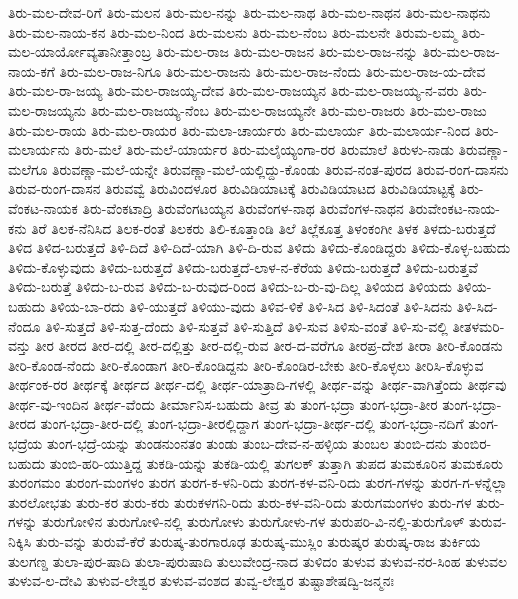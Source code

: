 {ತಿರು-ಮಲ-ದೇವ-ರಿಗೆ
ತಿರು-ಮಲನ
ತಿರು-ಮಲ-ನನ್ನು
ತಿರು-ಮಲ-ನಾಥ
ತಿರು-ಮಲ-ನಾಥನ
ತಿರು-ಮಲ-ನಾಥನು
ತಿರು-ಮಲ-ನಾಯ-ಕನ
ತಿರು-ಮಲ-ನಿಂದ
ತಿರು-ಮಲನು
ತಿರು-ಮಲ-ನೆಂಬ
ತಿರು-ಮಲನೇ
ತಿರುಮ-ಲಮ್ಮ
ತಿರು-ಮಲ-ಯಾರ್ಯೋವ್ಯತಾನೀತ್ತಾಂಬ್ರ
ತಿರು-ಮಲ-ರಾಜ
ತಿರು-ಮಲ-ರಾಜನ
ತಿರು-ಮಲ-ರಾಜ-ನನ್ನು
ತಿರು-ಮಲ-ರಾಜ-ನಾಯ-ಕಗೆ
ತಿರು-ಮಲ-ರಾಜ-ನಿಗೂ
ತಿರು-ಮಲ-ರಾಜನು
ತಿರು-ಮಲ-ರಾಜ-ನೆಂದು
ತಿರು-ಮಲ-ರಾಜ-ಯ-ದೇವ
ತಿರು-ಮಲ-ರಾ-ಜಯ್ಯ
ತಿರು-ಮಲ-ರಾಜಯ್ಯ-ದೇವ
ತಿರು-ಮಲ-ರಾಜಯ್ಯನ
ತಿರು-ಮಲ-ರಾಜಯ್ಯ-ನ-ವರು
ತಿರು-ಮಲ-ರಾಜಯ್ಯನು
ತಿರು-ಮಲ-ರಾಜಯ್ಯ-ನೆಂಬ
ತಿರು-ಮಲ-ರಾಜಯ್ಯನೇ
ತಿರು-ಮಲ-ರಾಜರು
ತಿರು-ಮಲ-ರಾಜು
ತಿರು-ಮಲ-ರಾಯ
ತಿರು-ಮಲ-ರಾಯರ
ತಿರು-ಮಲಾ-ಚಾರ್ಯರು
ತಿರು-ಮಲಾರ್ಯ
ತಿರು-ಮಲಾರ್ಯ-ನಿಂದ
ತಿರು-ಮಲಾರ್ಯನು
ತಿರು-ಮಲೆ
ತಿರು-ಮಲೆ-ಯಾರ್ಯರ
ತಿರು-ಮಲೈಯ್ಯಂಗಾ-ರರ
ತಿರುಮಾಲೆ
ತಿರುಳು-ನಾಡು
ತಿರುವಣ್ಣಾ-ಮಲೆಗೂ
ತಿರುವಣ್ಣಾ-ಮಲೆ-ಯನ್ನೇ
ತಿರುವಣ್ಣಾ-ಮಲೆ-ಯಲ್ಲಿದ್ದು-ಕೊಂಡು
ತಿರುವ-ನಂತ-ಪುರದ
ತಿರುವ-ರಂಗ-ದಾಸನು
ತಿರುವ-ರುಂಗ-ದಾಸನ
ತಿರುವವ್ವೆ
ತಿರುವಿಂದಳೂರ
ತಿರುವಿಡಿಯಾಟಕ್ಕೆ
ತಿರುವಿಡಿಯಾಟದ
ತಿರುವಿಡಿಯಾಟ್ಟಕ್ಕೆ
ತಿರು-ವೆಂಕಟ-ನಾಯಕ
ತಿರು-ವೆಂಕಟಾದ್ರಿ
ತಿರುವೆಂಗಟಯ್ಯನ
ತಿರುವೆಂಗಳ-ನಾಥ
ತಿರುವೆಂಗಳ-ನಾಥನ
ತಿರುವೇಂಕಟ-ನಾಯ-ಕನು
ತಿರೆ
ತಿಲಕ-ನೆನಿಸಿದ
ತಿಲಕ-ರಂತೆ
ತಿಲಕರು
ತಿಲಿ-ಕೂತ್ತಾಂಡಿ
ತಿಲೆ
ತಿಲ್ಲೆಕೂತ್ತ
ತಿಳಂಕಂಗೀ
ತಿಳಕ
ತಿಳದು-ಬರುತ್ತದೆ
ತಿಳಿದ
ತಿಳಿದ-ಬರುತ್ತದೆ
ತಿಳಿ-ದಿದೆ
ತಿಳಿ-ದಿದೆ-ಯಾಗಿ
ತಿಳಿ-ದಿ-ರುವ
ತಿಳಿದು
ತಿಳಿದು-ಕೊಂಡಿದ್ದರು
ತಿಳಿದು-ಕೊಳ್ಳ-ಬಹುದು
ತಿಳಿದು-ಕೊಳ್ಳುವುದು
ತಿಳಿದು-ಬರುತ್ತದೆ
ತಿಳಿದು-ಬರುತ್ತದೆ-ಲಾಳ-ನ-ಕೆರೆಯ
ತಿಳಿದು-ಬರುತ್ತದೆೆ
ತಿಳಿದು-ಬರುತ್ತವೆ
ತಿಳಿದು-ಬರುತ್ತೆ
ತಿಳಿದು-ಬ-ರುವ
ತಿಳಿದು-ಬ-ರುವುದ-ರಿಂದ
ತಿಳಿದು-ಬ-ರು-ವು-ದಿಲ್ಲ
ತಿಳಿಯದ
ತಿಳಿಯದು
ತಿಳಿಯ-ಬಹುದು
ತಿಳಿಯ-ಬಾ-ರದು
ತಿಳಿ-ಯುತ್ತದೆ
ತಿಳಿಯು-ವುದು
ತಿಳಿವ-ಳಿಕೆ
ತಿಳಿ-ಸಿದ
ತಿಳಿ-ಸಿದಂತೆ
ತಿಳಿ-ಸಿದನು
ತಿಳಿ-ಸಿದ-ನೆಂದೂ
ತಿಳಿ-ಸುತ್ತದೆ
ತಿಳಿ-ಸುತ್ತ-ದೆಂದು
ತಿಳಿ-ಸುತ್ತವೆ
ತಿಳಿ-ಸುತ್ತಿದೆ
ತಿಳಿ-ಸುವ
ತಿಳಿಸು-ವಂತೆ
ತಿಳಿ-ಸು-ವಲ್ಲಿ
ತೀತಳಮರಿ-ವನ್ತು
ತೀರ
ತೀರದ
ತೀರ-ದಲ್ಲಿ
ತೀರ-ದಲ್ಲಿತ್ತು
ತೀರ-ದಲ್ಲಿ-ರುವ
ತೀರ-ದ-ವರೆಗೂ
ತೀರಪ್ರ-ದೇಶ
ತೀರಾ
ತೀರಿ-ಕೊಂಡನು
ತೀರಿ-ಕೊಂಡ-ನೆಂದು
ತೀರಿ-ಕೊಂಡಾಗ
ತೀರಿ-ಕೊಂಡಿದ್ದನು
ತೀರಿ-ಕೊಂಡಿರ-ಬೇಕು
ತೀರಿ-ಕೊಳ್ಳಲು
ತೀರಿಸಿ-ಕೊಳ್ಳುವ
ತೀರ್ಥಂಕ-ರರ
ತೀರ್ಥಕ್ಕೆ
ತೀರ್ಥದ
ತೀರ್ಥ-ದಲ್ಲಿ
ತೀರ್ಥ-ಯಾತ್ರಾದಿ-ಗಳಲ್ಲಿ
ತೀರ್ಥ-ವನ್ನು
ತೀರ್ಥ-ವಾಗಿತ್ತೆಂದು
ತೀರ್ಥವು
ತೀರ್ಥ-ವು-ಇಂದಿನ
ತೀರ್ಥ-ವೆಂದು
ತೀರ್ಮಾನಿಸ-ಬಹುದು
ತೀವ್ರ
ತು
ತುಂಗ-ಭದ್ರಾ
ತುಂಗ-ಭದ್ರಾ-ತೀರ
ತುಂಗ-ಭದ್ರಾ-ತೀರದ
ತುಂಗ-ಭದ್ರಾ-ತೀರ-ದಲ್ಲಿ
ತುಂಗ-ಭದ್ರಾ-ತೀರಲ್ಲಿದ್ದಾಗ
ತುಂಗ-ಭದ್ರಾ-ತೀರ್ಥ-ದಲ್ಲಿ
ತುಂಗ-ಭದ್ರಾ-ನದಿಗೆ
ತುಂಗ-ಭದ್ರೆಯ
ತುಂಗ-ಭದ್ರೆ-ಯನ್ನು
ತುಂಡನುಂನತಂ
ತುಂಡು
ತುಂಬ-ದೇವ-ನ-ಹಳ್ಳಿಯ
ತುಂಬಲ
ತುಂಬಿ-ದನು
ತುಂಬಿರ-ಬಹುದು
ತುಂಬಿ-ಹರಿ-ಯುತ್ತಿದ್ದ
ತುಕಡಿ-ಯನ್ನು
ತುಕಡಿ-ಯಲ್ಲಿ
ತುಗಲಕ್
ತುತ್ತಾಗಿ
ತುಪದ
ತುಮಕೂರಿನ
ತುಮಕೂರು
ತುರಂಗಮಂ
ತುರಂಗ-ಮಂಗಳಂ
ತುರಗ
ತುರಗ-ಕ-ಳನಿ-ರಿದು
ತುರಗ-ಕಳ-ವನಿ-ರಿದು
ತುರಗ-ಗಳನ್ನು
ತುರಗ-ಗ-ಳನ್ನೆಲ್ಲಾ
ತುರಲೋಭತು
ತುರು-ಕರ
ತುರು-ಕರು
ತುರುಕಳಗನಿ-ರಿದು
ತುರು-ಕಳ-ವನಿ-ರಿದು
ತುರುಗಮಂಗಳಂ
ತುರು-ಗಳ
ತುರು-ಗಳನ್ನು
ತುರುಗೋಳಿನ
ತುರುಗೋಳಿ-ನಲ್ಲಿ
ತುರುಗೋಳು
ತುರುಗೋಳು-ಗಳ
ತುರುಪರಿ-ವಿ-ನಲ್ಲಿ-ತುರುಗೊಳ್
ತುರುವ-ನಿಕ್ಕಿಸಿ
ತುರು-ವನ್ನು
ತುರುವೆ-ಕೆರೆ
ತುರುಷ್ಕ-ತುರಗಾರೂಢ
ತುರುಷ್ಕ-ಮುಸ್ಲಿಂ
ತುರುಷ್ಕರ
ತುರುಷ್ಕ-ರಾಜ
ತುರ್ಕಿಯ
ತುಲಗಣ್ಡ
ತುಲಾ-ಪುರ-ಷಾದಿ
ತುಲಾ-ಪುರುಷಾದಿ
ತುಲುವೇಂದ್ರ-ನಾದ
ತುಳಿದಂ
ತುಳುವ
ತುಳುವ-ನರ-ಸಿಂಹ
ತುಳುವಲ
ತುಳುವ-ಲ-ದೇವಿ
ತುಳುವ-ಲೇಶ್ವರ
ತುಳುವ-ವಂಶದ
ತುವ್ವ-ಲೇಶ್ವರ
ತುಷ್ಟಾಶೇಷದ್ವಿ-ಜನ್ಮನಃ
}
